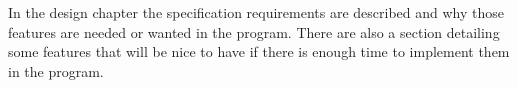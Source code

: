 In the design chapter the specification requirements are described and why those features are needed or wanted in the program. There are also a section detailing some features that will be nice to have if there is enough time to implement them in the program.